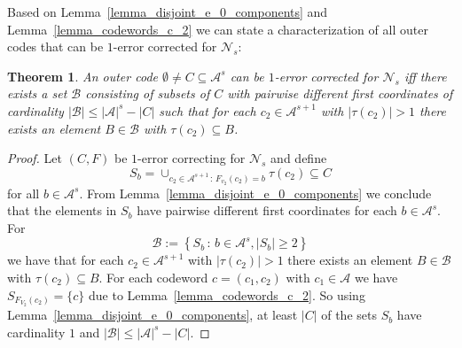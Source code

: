 \documentclass[11pt]{article}
\newcommand{\cA}{\mathcal{A}}
\newcommand{\cN}{\mathcal{N}}
\newtheorem{theorem}{Theorem}
\begin{document}
Based on Lemma~\ref{lemma_disjoint_e_0_components} and Lemma~\ref{lemma_codewords_c_2} we can state a characterization of all outer codes that can be $1$-error corrected for $\cN_s$: 
\begin{theorem}  
  \label{thm_cover_problem}
  An outer code $\emptyset\neq C\subseteq \cA^s$ can be $1$-error corrected for $\cN_s$ iff there exists a set $\mathcal{B}$ 
  consisting of subsets of $C$ with pairwise different first coordinates of cardinality $|\mathcal{B}|\le \left|\cA\right|^s-|C|$ such that for each 
  $c_2\in \cA^{s+1}$ with $|\tau(c_2)|>1$ there exists an element $B\in\mathcal{B}$ with $\tau(c_2)\subseteq B$.
\end{theorem}
\begin{proof}
  Let $(C,F)$ be $1$-error correcting for $\cN_s$ and define 
  \begin{equation}
    S_b=\cup_{c_2\in\cA^{s+1}\,:\, F_{v_2}(c_2)=b} \tau(c_2)\subseteq C 
  \end{equation}      
  for all $b\in \cA^s$. From Lemma~\ref{lemma_disjoint_e_0_components} we conclude that the elements in $S_b$ have pairwise different first coordinates for each $b\in \cA^s$. 
  For 
  \begin{equation}
    \mathcal{B}:=\left\{S_b\,:\, b\in \cA^s, \left|S_b\right|\ge 2 \right\}
  \end{equation}   
  we have that for each $c_2\in \cA^{s+1}$ with $|\tau(c_2)|>1$ there exists an element $B\in\mathcal{B}$ with $\tau(c_2)\subseteq B$. 
  For each codeword $c=\left(c_1,c_2\right)$ with $c_1\in\cA$ we have $S_{F_{V_2}(c_2)}=\{c\}$ due to Lemma~\ref{lemma_codewords_c_2}. So using Lemma~\ref{lemma_disjoint_e_0_components}, 
  at least $|C|$ of the sets $S_b$ have cardinality $1$ and $|\mathcal{B}|\le |\cA|^s-|C|$.
  
  \medskip
  

\end{proof}
\end{document}
